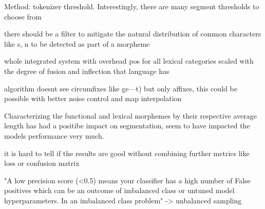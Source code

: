 Method: tokenizer threshold.
Interestingly, there are many segment thresholds to choose from

there should be a filter to mitigate the natural distribution of common characters like s, n to be detected as  part of a morpheme

whole integrated system with overhead pos for all lexical categories
scaled with the degree of fusion and inflection that language has

algorithm doesnt see circumfixes like ge---t) but only affixes, this could be possible with better noise control and map interpolation

Characterizing the functional and lexical morphemes by their respective average length has had a positibe impact on segmentation, seem to have impacted the models performance very much.

it is hard to tell if the results are good without combining further metrics like loss or confusion matrix

"A low precision score (<0.5) means your classifier has a high number of False positives which can be an outcome of imbalanced class or untuned model hyperparameters. In an imbalanced class problem"
-> unbalanced sampling
